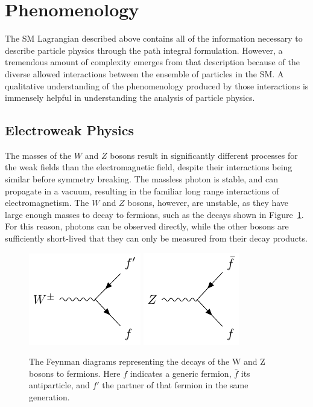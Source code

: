 \section{Phenomenology}

The \ac{SM} Lagrangian described above contains all of the information necessary to describe particle physics through the path integral formulation. 
However, a tremendous amount of complexity emerges from that description because of the diverse allowed interactions between the ensemble of particles in the \ac{SM}.
A qualitative understanding of the phenomenology produced by those interactions is immensely helpful in understanding the analysis of particle physics.

\subsection{Electroweak Physics}

The masses of the $W$ and $Z$ bosons result in significantly different processes for the weak fields than the electromagnetic field, despite their interactions being similar before symmetry breaking.
The massless photon is stable, and can propagate in a vacuum, resulting in the familiar long range interactions of electromagnetism.
The $W$ and $Z$ bosons, however, are unstable, as they have large enough masses to decay to fermions, such as the decays shown in Figure~\ref{fig:feyn_weak}.
For this reason, photons can be observed directly, while the other bosons are sufficiently short-lived that they can only be measured from their decay products.

\begin{figure}
\includegraphics[width=\halffig]{figures/feyn_wdecay.pdf}
\includegraphics[width=\halffig]{figures/feyn_zdecay.pdf}\\
\caption{The Feynman diagrams representing the decays of the W and Z bosons to fermions. Here $f$ indicates a generic fermion, $\bar{f}$ its antiparticle, and $f'$ the partner of that fermion in the same generation.}
\label{fig:feyn_weak}
\end{figure}

